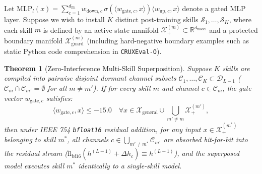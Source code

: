 \documentclass[10pt,twocolumn]{article}
\newtheorem{theorem}{Theorem}
\begin{document}
Let $\mathrm{MLP}_{l}(x) = \sum_{c=1}^{d_{\mathrm{ffn}}} w_{\mathrm{down}, c} \, \sigma(\langle w_{\mathrm{gate}, c}, x \rangle) \langle w_{\mathrm{up}, c}, x \rangle$ denote a gated MLP layer. Suppose we wish to install $K$ distinct post-training skills $\mathcal{S}_1, \dots, \mathcal{S}_K$, where each skill $m$ is defined by an active state manifold $\mathcal{X}_+^{(m)} \subset \mathbb{R}^{d_{\mathrm{model}}}$ and a protected boundary manifold $\mathcal{X}_{\mathrm{guard}}^{(m)}$ (including hard-negative boundary examples such as static Python code comprehension in \texttt{CRUXEval-O}).

\begin{theorem}[Zero-Interference Multi-Skill Superposition]
\label{thm:superposition}
Suppose $K$ skills are compiled into pairwise disjoint dormant channel subsets $\mathcal{C}_1, \dots, \mathcal{C}_K \subset \mathcal{D}_{L-1}$ ($\mathcal{C}_m \cap \mathcal{C}_{m'} = \emptyset$ for all $m \ne m'$). If for every skill $m$ and channel $c \in \mathcal{C}_m$, the gate vector $w_{\mathrm{gate},c}$ satisfies:
\begin{equation}
\langle w_{\mathrm{gate},c}, x \rangle \le -15.0 \quad \forall x \in \mathcal{X}_{\mathrm{general}} \cup \bigcup_{m' \ne m} \mathcal{X}_+^{(m')},
\end{equation}
then under IEEE 754 \texttt{bfloat16} residual addition, for any input $x \in \mathcal{X}_+^{(m^*)}$ belonging to skill $m^*$, all channels $c \in \bigcup_{m' \ne m^*} \mathcal{C}_{m'}$ are absorbed bit-for-bit into the residual stream ($\mathrm{fl}_{\mathrm{bf16}}(h^{(L-1)} + \Delta h_c) \equiv h^{(L-1)}$), and the superposed model executes skill $m^*$ identically to a single-skill model.
\end{theorem}
\end{document}
